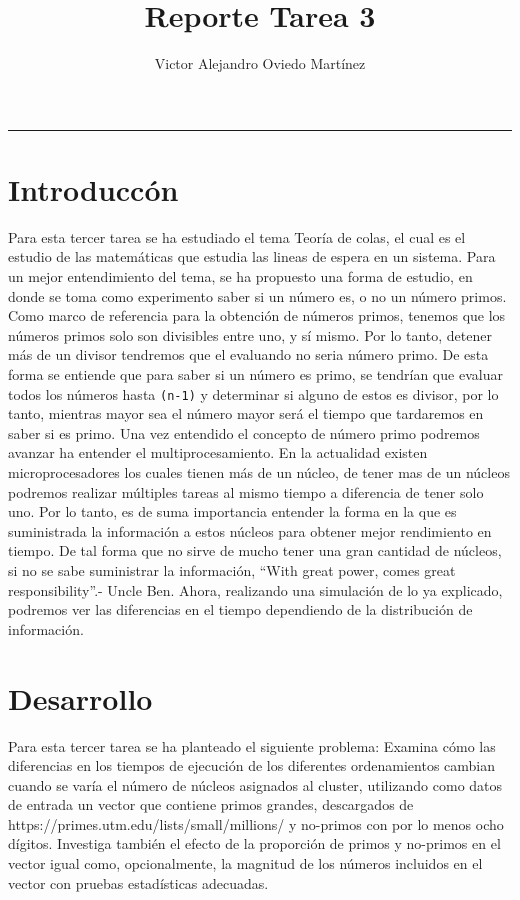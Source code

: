 \documentclass{article}
\title{Reporte Tarea 3}
\author{Victor Alejandro Oviedo Martínez}
\begin{document}
\maketitle
\hrule

\section{Introduccón}\label{intro}

Para esta tercer tarea\citep{DRA.P3} se ha estudiado el tema Teoría de colas, el cual es el estudio de las matemáticas que estudia las lineas de espera en un sistema. Para un mejor entendimiento del tema, se ha propuesto una forma de estudio, en donde se toma como experimento saber si un número es, o no un número primos. Como marco de referencia para la obtención de números primos, tenemos que los números primos solo son divisibles entre uno, y sí mismo. Por lo tanto, detener más de un divisor tendremos que el evaluando no seria número primo.  De esta forma se entiende que para saber si un número es primo, se tendrían que evaluar todos los números hasta  \texttt{(n-1)} y determinar si alguno de estos es divisor, por lo tanto, mientras mayor sea el número mayor será el tiempo que tardaremos en saber si es primo.  Una vez entendido el concepto de número primo podremos avanzar ha entender el multiprocesamiento. En la actualidad existen microprocesadores los cuales tienen más de un núcleo,  de tener mas de un núcleos podremos realizar múltiples tareas al mismo tiempo a diferencia de tener solo uno. Por lo tanto, es de suma importancia entender la forma en la que es suministrada la información a estos núcleos para obtener mejor rendimiento en tiempo. De tal forma que no sirve de mucho tener una gran cantidad de núcleos, si no se sabe suministrar la información, ``With great power, comes great responsibility''.- Uncle Ben. Ahora, realizando una simulación de lo ya explicado, podremos ver las diferencias en el tiempo dependiendo  de la distribución de  información.   \\



\section{Desarrollo}

Para esta tercer tarea se ha planteado el siguiente problema: Examina cómo las diferencias en los tiempos de ejecución de los diferentes ordenamientos cambian cuando se varía el número de núcleos asignados al cluster, utilizando como datos de entrada un vector que contiene primos grandes, descargados de https://primes.utm.edu/lists/small/millions/ y no-primos con por lo menos ocho dígitos. Investiga también el efecto de la proporción de primos y no-primos en el vector igual como, opcionalmente, la magnitud de los números incluidos en el vector con pruebas estadísticas adecuadas.\\
\end{document}

